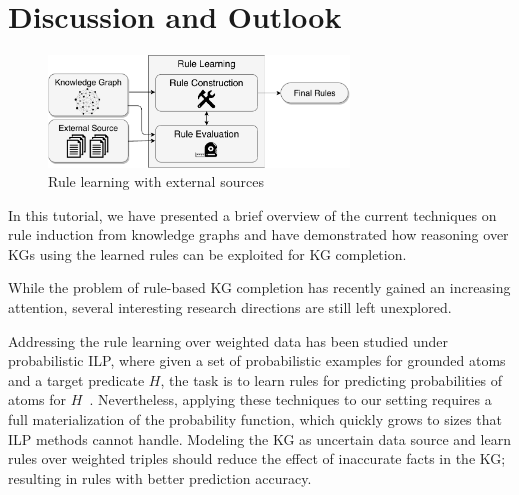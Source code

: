 \section{Discussion and Outlook}\label{sec:disc}

\begin{figure}[t]
\centering
\includegraphics[width=8cm]{figures/discussion_overview}
\caption{Rule learning with external sources}
\label{fig:discussion_overview}
\end{figure}

In this tutorial, we have presented a brief overview of the current techniques on rule induction from knowledge graphs and have demonstrated how reasoning over KGs using the learned rules  can be exploited for KG completion. %

While the problem of rule-based KG completion has recently gained an increasing attention, several interesting research directions are still left unexplored. %


 Addressing the rule learning over weighted data has been studied under probabilistic ILP, where given a set of probabilistic examples for grounded atoms
and a target predicate $H$, the task is to learn rules for predicting probabilities of 
atoms for $H$~\cite{probfoil,DBLP:conf/ijcai/RaedtDTBV15,DBLP:conf/clima/CorapiSIR11}.  
Nevertheless, applying these techniques to our setting requires a full materialization of the probability function,
which quickly grows to sizes that ILP methods cannot handle. Modeling the KG as uncertain data source and learn rules over weighted triples should reduce the effect of inaccurate facts in the KG; resulting in rules with better prediction accuracy.   


